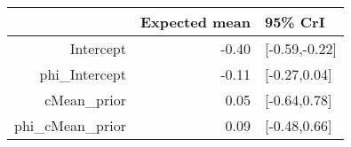 \begin{tabular}{rrl}
  \hline
 & Expected mean & 95\% CrI \\ 
  \hline
Intercept & -0.40 & [-0.59,-0.22] \\ 
  phi\_Intercept & -0.11 & [-0.27,0.04] \\ 
  cMean\_prior & 0.05 & [-0.64,0.78] \\ 
  phi\_cMean\_prior & 0.09 & [-0.48,0.66] \\ 
   \hline
\end{tabular}

